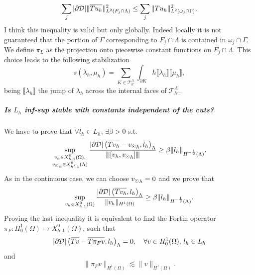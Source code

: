 \begin{equation*}
\sum _j |\partial\mathcal{D}| \|\overline{T u_h}\|^2_{L^2(F_j \cap \Lambda)} \leq \sum _j \|T u_h\|^2_{L^2(\omega_j\cap \Gamma)}.
\end{equation*}
{\color{red} I think this inequality is valid but only globally. Indeed locally it is not guaranteed that the portion of $\Gamma$ corresponding to $F_j \cap \Lambda$ is contained in $\omega _j \cap \Gamma$}. \\
We define $\pi_L$ as the projection onto piecewise constant functions on $F_j\cap \Lambda$. This choice leads to the following stabilization 
\begin{equation*}
s(\lambda_h, \mu_h)= \sum _{K\in \mathcal{T}_{h'}^{\Lambda}} \int_{\partial K} h \llbracket \lambda_h \rrbracket \llbracket \mu_h \rrbracket,
\end{equation*}
being $\llbracket \lambda_h \rrbracket$ the jump of $\lambda_h$ across the internal faces of $\mathcal{T}_{h'}^{\Lambda}$.

\subparagraph{Is $L_h$ inf-sup stable with constants independent of the cuts?} We have to prove that $\forall l_h \in L_h$, $\exists \beta >0$ s.t.
\begin{equation*}
\sup_{\substack{v_h \in X_{h,1}^0(\Omega),\\ {v_{\odot}}_h \in X_{h',1}^0(\Lambda)}} \frac{|\partial\mathcal{D}|\left(\overline{T v_h} - {v_{\odot}}_h, l _h\right)_{\Lambda}}{{\left\vert\kern-0.25ex\left\vert\kern-0.25ex\left\vert [v_h, {v_{\odot}}_h] \right\vert\kern-0.25ex\right\vert\kern-0.25ex\right\vert}} \geq \beta \|l_h\|_{H^{-\frac 12}(\Lambda)}.
\end{equation*}
As in the continuous case, we can choose ${v_{\odot}}_h=0$ and we prove that
\begin{equation*} 
\sup_{v_h \in X_{h,1}^0(\Omega)} \frac{|\partial\mathcal{D}|\left(\overline{T v_h} , l _h\right)_{\Lambda}}{\|v_h\|_{H^1(\Omega)}} \geq \beta \|l_h\|_{H^{-\frac 12}(\Lambda)}.
\end{equation*} 
Proving the last inequality it is equivalent to find the Fortin operator $\pi_F: H^1_0(\Omega) \rightarrow X_{h,1}^0(\Omega)$, such that 
\begin{equation*}
|\partial\mathcal{D}|\left(\overline{T v} - \overline{T \pi _F v}  , l _h\right)_{\Lambda}=0, \quad \forall v\in H^1_0(\Omega), \, l_h \in L_h
\end{equation*} 
and
\begin{equation*}
\|\pi_F v\|_{H^1(\Omega)}\lesssim \|v\|_{H^1(\Omega)}.
\end{equation*} 

